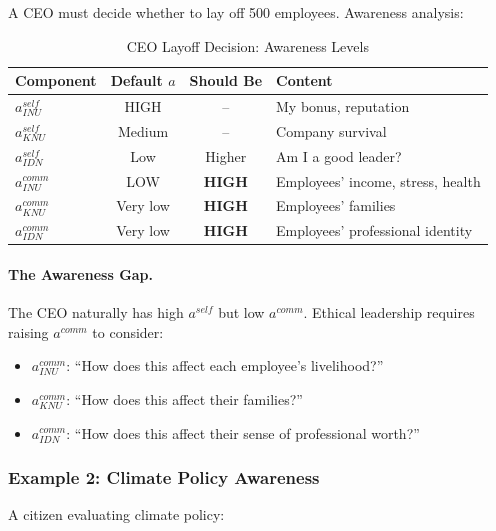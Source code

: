 A CEO must decide whether to lay off 500 employees. Awareness analysis:

\begin{table}[htbp]
\centering
\caption{CEO Layoff Decision: Awareness Levels}
\label{tab:ceo-layoff}
\renewcommand{\arraystretch}{1.3}
\begin{tabular}{@{}lccp{4cm}@{}}
\toprule
\textbf{Component} & \textbf{Default $a$} & \textbf{Should Be} & \textbf{Content} \\
\midrule
$a^{self}_{INU}$ & HIGH & -- & My bonus, reputation \\
$a^{self}_{KNU}$ & Medium & -- & Company survival \\
$a^{self}_{IDN}$ & Low & Higher & Am I a good leader? \\
$a^{comm}_{INU}$ & LOW & \textbf{HIGH} & Employees' income, stress, health \\
$a^{comm}_{KNU}$ & Very low & \textbf{HIGH} & Employees' families \\
$a^{comm}_{IDN}$ & Very low & \textbf{HIGH} & Employees' professional identity \\
\bottomrule
\end{tabular}
\end{table}

\paragraph{The Awareness Gap.}
The CEO naturally has high $a^{self}$ but low $a^{comm}$. Ethical leadership
requires raising $a^{comm}$ to consider:
\begin{itemize}
\item $a^{comm}_{INU}$: ``How does this affect each employee's livelihood?''
\item $a^{comm}_{KNU}$: ``How does this affect their families?''
\item $a^{comm}_{IDN}$: ``How does this affect their sense of professional worth?''
\end{itemize}

\subsubsection{Example 2: Climate Policy Awareness}

A citizen evaluating climate policy:

